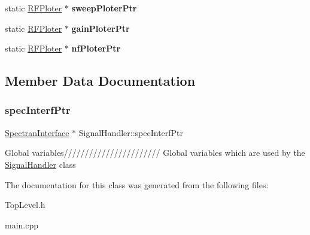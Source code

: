 \begin{DoxyCompactItemize}
\item 
\mbox{\label{classSignalHandler_a15d34535b8684c5988ff1af1bf6062f6}} 
static \hyperlink{classRFPloter}{R\+F\+Ploter} $\ast$ {\bfseries sweep\+Ploter\+Ptr}
\item 
\mbox{\label{classSignalHandler_a1c6637986751faafe7cb5ffd58400f77}} 
static \hyperlink{classRFPloter}{R\+F\+Ploter} $\ast$ {\bfseries gain\+Ploter\+Ptr}
\item 
\mbox{\label{classSignalHandler_ada606b8ef692809838f1e5464871742c}} 
static \hyperlink{classRFPloter}{R\+F\+Ploter} $\ast$ {\bfseries nf\+Ploter\+Ptr}
\end{DoxyCompactItemize}


\subsection{Member Data Documentation}
\mbox{\label{classSignalHandler_a855d0b79fcbacf50e4a1d12bd5d1bf53}} 
\subsubsection{\texorpdfstring{spec\+Interf\+Ptr}{specInterfPtr}}
{\footnotesize\ttfamily \hyperlink{classSpectranInterface}{Spectran\+Interface} $\ast$ Signal\+Handler\+::spec\+Interf\+Ptr\hspace{0.3cm}{\ttfamily [static]}}

Global variables/////////////////////// Global variables which are used by the \hyperlink{classSignalHandler}{Signal\+Handler} class 

The documentation for this class was generated from the following files\+:\begin{DoxyCompactItemize}
\item 
Top\+Level.\+h\item 
main.\+cpp\end{DoxyCompactItemize}
